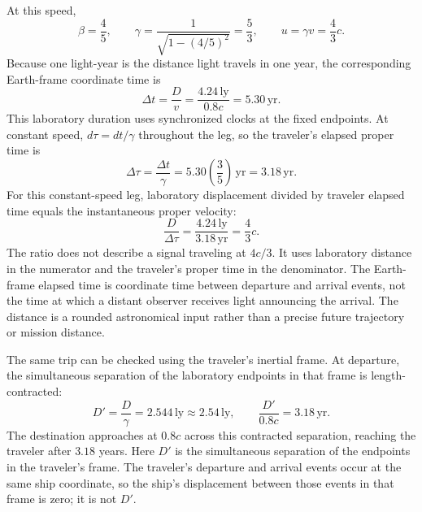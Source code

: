 \documentclass[12pt]{article}
\begin{document}
At this speed,
\begin{equation}
  \beta=\frac45,
  \qquad
  \gamma=\frac{1}{\sqrt{1-(4/5)^2}}=\frac53,
  \qquad
  u=\gamma v=\frac43c.
  \label{eq:proxima-speed-values}
\end{equation}
Because one light-year is the distance light travels in one year, the corresponding Earth-frame coordinate time is
\begin{equation}
  \Delta t=\frac{D}{v}
  =\frac{4.24\,\mathrm{ly}}{0.8c}
  =5.30\,\mathrm{yr}.
  \label{eq:proxima-lab-time}
\end{equation}
This laboratory duration uses synchronized clocks at the fixed endpoints.
At constant speed, $d\tau=dt/\gamma$ throughout the leg, so the traveler's elapsed proper time is
\begin{equation}
  \Delta\tau=\frac{\Delta t}{\gamma}
  =5.30\left(\frac35\right)\,\mathrm{yr}
  =3.18\,\mathrm{yr}.
  \label{eq:proxima-proper-time}
\end{equation}
For this constant-speed leg, laboratory displacement divided by traveler elapsed time equals the instantaneous proper velocity:
\begin{equation}
  \frac{D}{\Delta\tau}
  =\frac{4.24\,\mathrm{ly}}{3.18\,\mathrm{yr}}
  =\frac43c.
  \label{eq:proxima-average}
\end{equation}
The ratio does not describe a signal traveling at $4c/3$. It uses laboratory distance in the numerator and the traveler's proper time in the denominator. The Earth-frame elapsed time is coordinate time between departure and arrival events, not the time at which a distant observer receives light announcing the arrival. The distance is a rounded astronomical input rather than a precise future trajectory or mission distance.

The same trip can be checked using the traveler's inertial frame. At departure, the simultaneous separation of the laboratory endpoints in that frame is length-contracted:
\begin{equation}
  D'=\frac{D}{\gamma}=2.544\,\mathrm{ly}\approx2.54\,\mathrm{ly},
  \qquad
  \frac{D'}{0.8c}=3.18\,\mathrm{yr}.
  \label{eq:contracted-distance}
\end{equation}
The destination approaches at $0.8c$ across this contracted separation, reaching the traveler after $3.18$ years. Here $D'$ is the simultaneous separation of the endpoints in the traveler's frame. The traveler's departure and arrival events occur at the same ship coordinate, so the ship's displacement between those events in that frame is zero; it is not $D'$.
\end{document}
